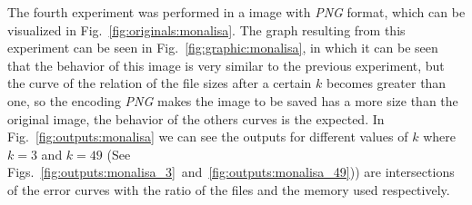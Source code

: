 \documentclass[journal]{IEEEtran}
\begin{document}
The fourth experiment was performed in a image with \textit{PNG} format, which can be visualized in Fig.~\ref{fig:originals:monalisa}.
The graph resulting from this experiment can be seen in Fig.~\ref{fig:graphic:monalisa}, in which it can be seen that the behavior of this image is very similar to the previous experiment, but the curve of the relation of the file sizes after a certain $k$ becomes greater than one, so the encoding \textit{PNG} makes the image to be saved has a more size than the original image, the behavior of the others curves is the expected.
In Fig.~\ref{fig:outputs:monalisa} we can see the outputs for different values of $k$ where $k=3$ and $k=49$ (See Figs.~\ref{fig:outputs:monalisa_3}~and~\ref{fig:outputs:monalisa_49})) are intersections of the error curves with the ratio of the files and the memory used respectively.
\end{document}
